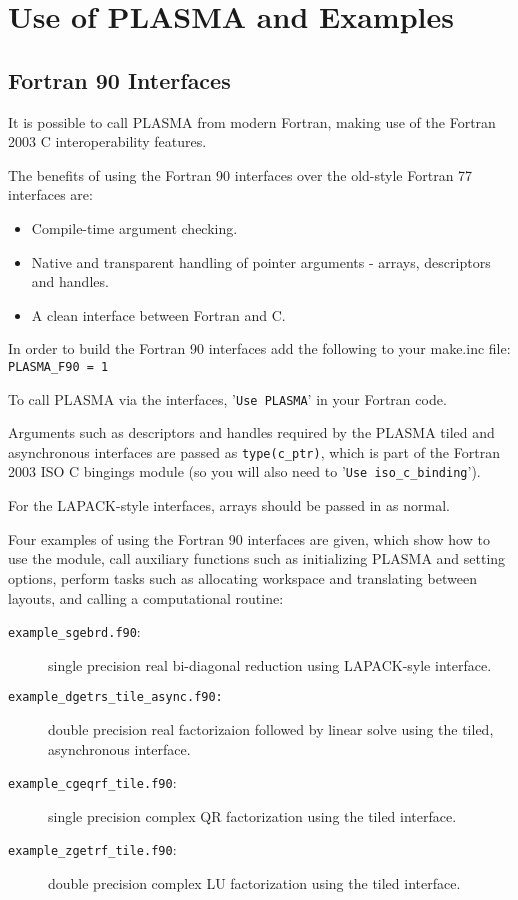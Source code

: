 
\chapter{Use of PLASMA and Examples}

\section{Fortran 90 Interfaces}

It is possible to call PLASMA from modern Fortran, making use of the
Fortran 2003 C interoperability features. 

The benefits of using the Fortran 90 interfaces over the old-style Fortran 77 interfaces are:
\begin{itemize}
\item Compile-time argument checking.
\item Native and transparent handling of pointer arguments - arrays, descriptors and handles.
\item A clean interface between Fortran and C.
\end{itemize}
	
In order to build the Fortran 90 interfaces add the following to your
make.inc file: \verb+PLASMA_F90 = 1+

To call PLASMA via the interfaces, '\texttt{Use PLASMA}' in your Fortran code.

Arguments such as descriptors and handles required by the PLASMA tiled
and asynchronous interfaces are passed as \texttt{type(c\_ptr)}, which
is part of the Fortran 2003 ISO C bingings module  
(so you will also need to '\texttt{Use iso\_c\_binding}').

For the LAPACK-style interfaces, arrays should be passed in as normal.

Four examples of using the Fortran 90 interfaces are given, which show how to use the module, 
call auxiliary functions such as initializing PLASMA and setting options, perform tasks such 
as allocating workspace and translating between layouts, and calling a computational routine:
\begin{description}
\item[\texttt{example\_sgebrd.f90}:] single precision real bi-diagonal
  reduction using LAPACK-syle interface. 
\item[\texttt{example\_dgetrs\_tile\_async.f90:}] double precision
  real factorizaion followed by linear solve using the tiled,
  asynchronous interface. 
\item[\texttt{example\_cgeqrf\_tile.f90}:] single precision complex QR
  factorization using the tiled interface. 
\item[\texttt{example\_zgetrf\_tile.f90}:] double precision complex LU
  factorization using the tiled interface. 
\end{description}

